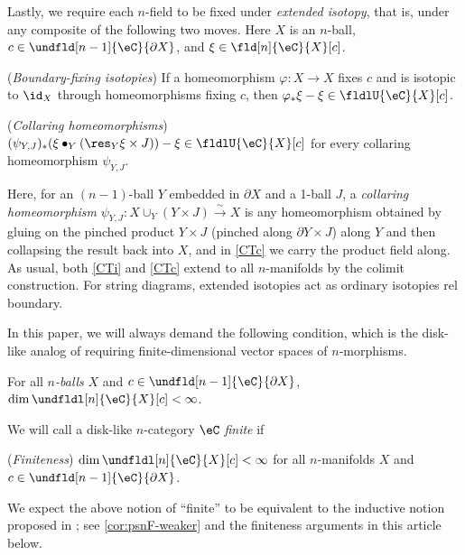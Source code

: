 \documentclass[12pt,reqno]{amsart}
\newcommand{\C}{\eC}
\newcommand{\blt}{\bullet}
\newcommand{\defn}[1]{\emph{#1}}
\begin{document}
Lastly, we require each $n$-field to be fixed under \defn{extended isotopy}, that is, under any composite of the following two moves. Here $X$ is an $n$-ball, $c\in\undfld[n-1]{\C}{\partial X}$, and $\xi\in\fld[n]{\C}{X}[c]$.
\begin{lst}
    \item[(C$U$i)]\label{CTi} (\emph{Boundary-fixing isotopies}) If a homeomorphism $\varphi\colon X\to X$ fixes $c$ and is isotopic to $\id_X$ through homeomorphisms fixing $c$, then $\varphi_*\xi-\xi\in\fldlU{\C}{X}[c]$.
    \item[(C$U$c)]\label{CTc} (\emph{Collaring homeomorphisms}) $(\psi_{Y,J})_*(\xi\blt_Y(\res_Y\xi\times J))-\xi\in\fldlU{\C}{X}[c]$ for every collaring homeomorphism $\psi_{Y,J}$.
\end{lst}
Here, for an $(n-1)$-ball $Y$ embedded in $\partial X$ and a 1-ball $J$, a \defn{collaring homeomorphism} $\psi_{Y,J}\colon X\cup_Y(Y\times J)\xrightarrow{\sim}X$ is any homeomorphism obtained by gluing on the pinched product $Y\times J$ (pinched along $\partial Y\times J$) along $Y$ and then collapsing the result back into $X$, and in \ref{CTc} we carry the product field along. As usual, both \ref{CTi} and \ref{CTc} extend to all $n$-manifolds by the colimit construction. For string diagrams, extended isotopies act as ordinary isotopies rel boundary.

In this paper, we will always demand the following condition, which is the disk-like analog of requiring finite-dimensional vector spaces of $n$-morphisms.
\begin{lst}
    \item[(CFD)]\label{FDF}
    For all \emph{$n$-balls} $X$ and $c\in\undfld[n-1]{\C}{\partial X}$, $\dim\undfldl[n]{\C}{X}[c]<\infty$.
\end{lst}

\begin{definition}
We will call a disk-like $n$-category $\C$ \defn{finite} if
\begin{lst}
    \item[(F)]
    \label{psnF}
    (\emph{Finiteness})
    $\dim\undfldl[n]{\C}{X}[c]<\infty$ for all $n$-manifolds $X$ and $c\in\undfld[n-1]{\C}{\partial X}$.
\end{lst}
\end{definition}

\begin{remark}
We expect the above notion of ``finite'' to be equivalent to the inductive notion proposed in \cite[Rmk. 2.28]{3Hilb}; see \cref{cor:psnF-weaker} and the finiteness arguments in this article below.
\end{remark}
\end{document}
